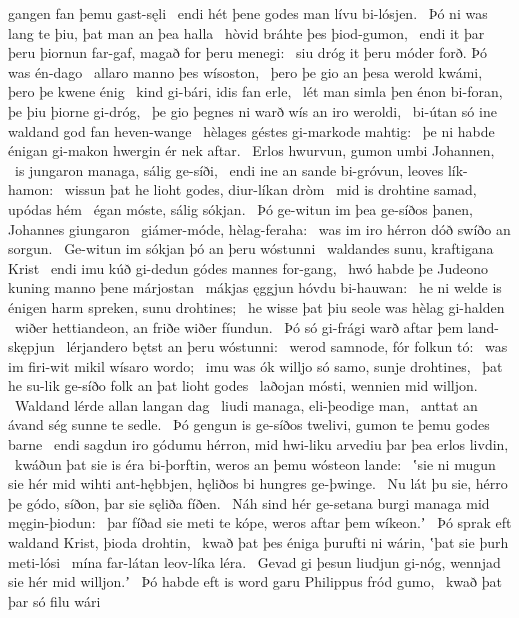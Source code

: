 gangen fan þemu gast-sęli \hld\ endi hét þene godes man
lívu bi-lósjen. \hld\ Þó ni was lang te þiu,
þat man an þea halla \hld\ hòvid bráhte
þes þiod-gumon, \hld\ endi it þar þeru þiornun far-gaf,
magað for þeru menegi: \hld\ siu dróg it þeru móder forð.
Þó was én-dago \hld\ allaro manno
þes wísoston, \hld\ þero þe gio an þesa werold kwámi,
þero þe kwene énig \hld\ kind gi-bári,
idis fan erle, \hld\ lét man simla þen énon bi-foran,
þe þiu þiorne gi-dróg, \hld\ þe gio þegnes ni warð
wís an iro weroldi, \hld\ bi-útan só ine waldand god
fan heven-wange \hld\ hèlages géstes
gi-markode mahtig: \hld\ þe ni habde énigan gi-makon hwergin
ér nek aftar. \hld\ Erlos hwurvun,
gumon umbi Johannen, \hld\ is jungaron managa,
sálig ge-síði, \hld\ endi ine an sande bi-gróvun,
leoves lík-hamon: \hld\ wissun þat he lioht godes,
diur-líkan dròm \hld\ mid is drohtine samad,
upódas hém \hld\ égan móste,
sálig sókjan. \hld\ Þó ge-witun im þea ge-síðos þanen,
Johannes giungaron \hld\ giámer-móde,
hèlag-feraha: \hld\ was im iro hérron dóð
swíðo an sorgun. \hld\ Ge-witun im sókjan þó
an þeru wóstunni \hld\ waldandes sunu,
kraftigana Krist \hld\ endi imu kúð gi-dedun
gódes mannes for-gang, \hld\ hwó habde þe Judeono kuning
manno þene márjostan \hld\ mákjas ęggjun
hóvdu bi-hauwan: \hld\ he ni welde is énigen harm spreken,
sunu drohtines; \hld\ he wisse þat þiu seole was
hèlag gi-halden \hld\ wiðer hettiandeon,
an friðe wiðer fíundun. \hld\ Þó só gi-frági warð
aftar þem land-skępjun \hld\ lérjandero bętst
an þeru wóstunni: \hld\ werod samnode,
fór folkun tó: \hld\ was im firi-wit mikil
wísaro wordo; \hld\ imu was ók willjo só samo,
sunje drohtines, \hld\ þat he su-lik ge-síðo folk
an þat lioht godes \hld\ laðojan mósti,
wennien mid willjon. \hld\ Waldand lérde
allan langan dag \hld\ liudi managa,
eli-þeodige man, \hld\ anttat an ávand ség
sunne te sedle. \hld\ Þó gengun is ge-síðos twelivi,
gumon te þemu godes barne \hld\ endi sagdun iro gódumu hérron,
mid hwi-liku arvediu þar þea erlos livdin, \hld\ kwáðun þat sie is éra bi-þorftin,
weros an þemu wósteon lande: \hld\ ʽsie ni mugun sie hér mid wihti ant-hębbjen,
hęliðos bi hungres ge-þwinge. \hld\ Nu lát þu sie, hérro þe gódo,
síðon, þar sie sęliða fíðen. \hld\ Náh sind hér ge-setana burgi
managa mid męgin-þiodun: \hld\ þar fíðad sie meti te kópe,
weros aftar þem wíkeon.ʼ \hld\ Þó sprak eft waldand Krist,
þioda drohtin, \hld\ kwað þat þes éniga þurufti ni wárin,
ʽþat sie þurh meti-lósi \hld\ mína far-látan
leov-líka léra. \hld\ Gevad gi þesun liudjun gi-nóg,
wennjad sie hér mid willjon.ʼ \hld\ Þó habde eft is word garu
Philippus fród gumo, \hld\ kwað þat þar só filu wári
